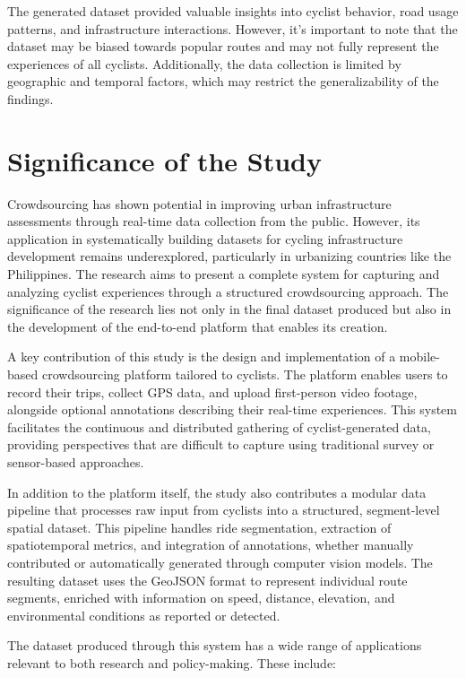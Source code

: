 The generated dataset provided valuable insights into cyclist behavior, road usage patterns, and infrastructure interactions. However, it's important to note that the dataset may be biased towards popular routes and may not fully represent the experiences of all cyclists. Additionally, the data collection is limited by geographic and temporal factors, which may restrict the generalizability of the findings.

\section{Significance of the Study}
\label{sec:significance}

Crowdsourcing has shown potential in improving urban infrastructure assessments through real-time data collection from the public. However, its application in systematically building datasets for cycling infrastructure development remains underexplored, particularly in urbanizing countries like the Philippines. The research aims to present a complete system for capturing and analyzing cyclist experiences through a structured crowdsourcing approach. The significance of the research lies not only in the final dataset produced but also in the development of the end-to-end platform that enables its creation.

A key contribution of this study is the design and implementation of a mobile-based crowdsourcing platform tailored to cyclists. The platform enables users to record their trips, collect GPS data, and upload first-person video footage, alongside optional annotations describing their real-time experiences. This system facilitates the continuous and distributed gathering of cyclist-generated data, providing perspectives that are difficult to capture using traditional survey or sensor-based approaches.

In addition to the platform itself, the study also contributes a modular data pipeline that processes raw input from cyclists into a structured, segment-level spatial dataset. This pipeline handles ride segmentation, extraction of spatiotemporal metrics, and integration of annotations, whether manually contributed or automatically generated through computer vision models. The resulting dataset uses the GeoJSON format to represent individual route segments, enriched with information on speed, distance, elevation, and environmental conditions as reported or detected.

The dataset produced through this system has a wide range of applications relevant to both research and policy-making. These include:

